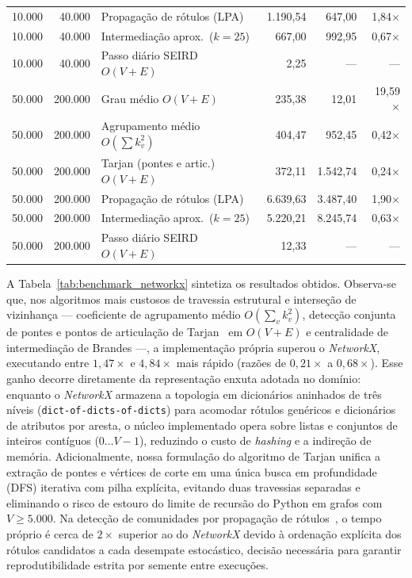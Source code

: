 \documentclass[11pt]{article}
\begin{document}
\begin{table}[!ht]
\begin{tabular}{rrlrrr}
10.000 & 40.000  & Propagação de rótulos (LPA)       & 1.190,54 & 647,00   & 1,84$\times$ \\
10.000 & 40.000  & Intermediação aprox.\ ($k=25$)    & 667,00   & 992,95   & 0,67$\times$ \\
10.000 & 40.000  & Passo diário SEIRD $O(V+E)$       & 2,25     & ---      & ---          \\
\hline
50.000 & 200.000 & Grau médio $O(V+E)$               & 235,38   & 12,01    & 19,59$\times$ \\
50.000 & 200.000 & Agrupamento médio $O(\sum k_v^2)$ & 404,47   & 952,45   & 0,42$\times$ \\
50.000 & 200.000 & Tarjan (pontes e artic.) $O(V+E)$ & 372,11   & 1.542,74 & 0,24$\times$ \\
50.000 & 200.000 & Propagação de rótulos (LPA)       & 6.639,63 & 3.487,40 & 1,90$\times$ \\
50.000 & 200.000 & Intermediação aprox.\ ($k=25$)    & 5.220,21 & 8.245,74 & 0,63$\times$ \\
50.000 & 200.000 & Passo diário SEIRD $O(V+E)$       & 12,33    & ---      & ---          \\
\hline
\end{tabular}
\end{table}

A Tabela~\ref{tab:benchmark_networkx} sintetiza os resultados obtidos. Observa-se que, nos algoritmos mais custosos de travessia estrutural e interseção de vizinhança --- coeficiente de agrupamento médio $O(\sum_{v} k_v^2)$, detecção conjunta de pontes e pontos de articulação de Tarjan~\cite{tarjan1972} em $O(V+E)$ e centralidade de intermediação de Brandes ---, a implementação própria superou o \emph{NetworkX}, executando entre $1{,}47\times$ e $4{,}84\times$ mais rápido (razões de $0{,}21\times$ a $0{,}68\times$). Esse ganho decorre diretamente da representação enxuta adotada no domínio: enquanto o \emph{NetworkX} armazena a topologia em dicionários aninhados de três níveis (\texttt{dict-of-dicts-of-dicts}) para acomodar rótulos genéricos e dicionários de atributos por aresta, o núcleo implementado opera sobre listas e conjuntos de inteiros contíguos ($0 \dots V-1$), reduzindo o custo de \emph{hashing} e a indireção de memória. Adicionalmente, nossa formulação do algoritmo de Tarjan unifica a extração de pontes e vértices de corte em uma única busca em profundidade (DFS) iterativa com pilha explícita, evitando duas travessias separadas e eliminando o risco de estouro do limite de recursão do Python em grafos com $V \ge 5.000$. Na detecção de comunidades por propagação de rótulos~\cite{raghavan2007}, o tempo próprio é cerca de $2\times$ superior ao do \emph{NetworkX} devido à ordenação explícita dos rótulos candidatos a cada desempate estocástico, decisão necessária para garantir reprodutibilidade estrita por semente entre execuções.
\end{document}
